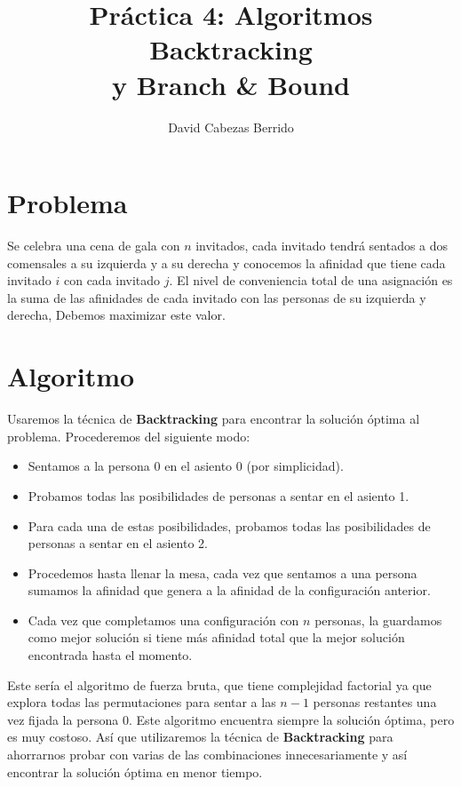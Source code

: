 \documentclass[a4]{article}
\author{David Cabezas Berrido}
\date{\vspace{-5mm}}
\title{\huge Práctica 4: Algoritmos Backtracking \\ y Branch \& Bound \HRule\vspace{-4mm}}
\begin{document}
\maketitle
\vspace{20mm}
\tableofcontents

\newpage

\section{Problema}

Se celebra una cena de gala con $n$ invitados, cada invitado tendrá
sentados a dos comensales a su izquierda y a su derecha y conocemos la
afinidad que tiene cada invitado $i$ con cada invitado $j$. El nivel
de conveniencia total de una asignación es la suma de las afinidades
de cada invitado con las personas de su izquierda y derecha, Debemos
maximizar este valor.

\section{Algoritmo}

Usaremos la técnica de \textbf{Backtracking} para encontrar la
solución óptima al problema. Procederemos del siguiente modo:

\begin{itemize}
\item Sentamos a la persona 0 en el asiento 0 (por simplicidad).
\item Probamos todas las posibilidades de personas a sentar en el
  asiento 1.
\item Para cada una de estas posibilidades, probamos todas las
  posibilidades de personas a sentar en el asiento 2.
\item Procedemos hasta llenar la mesa, cada vez que sentamos a una
  persona sumamos la afinidad que genera a la afinidad de la
  configuración anterior.
\item Cada vez que completamos una configuración con $n$ personas, la
  guardamos como mejor solución si tiene más afinidad total que la
  mejor solución encontrada hasta el momento.
\end{itemize}

Este sería el algoritmo de fuerza bruta, que tiene complejidad
factorial ya que explora todas las permutaciones para sentar a las
$n-1$ personas restantes una vez fijada la persona 0. Este algoritmo
encuentra siempre la solución óptima, pero es muy costoso. Así que
utilizaremos la técnica de \textbf{Backtracking} para ahorrarnos
probar con varias de las combinaciones innecesariamente y así
encontrar la solución óptima en menor tiempo.
\end{document}
